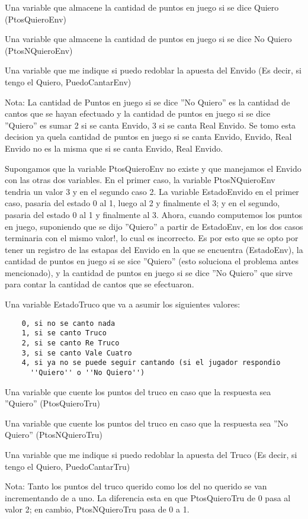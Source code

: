 Una variable que almacene la cantidad de puntos en juego si se dice Quiero (PtosQuieroEnv)

Una variable que almacene la cantidad de puntos en juego si se dice No Quiero (PtosNQuieroEnv)

Una variable que me indique si puedo redoblar la apuesta del Envido (Es decir, si tengo el Quiero, PuedoCantarEnv)

Nota: La cantidad de Puntos en juego si se dice ''No Quiero'' es la cantidad de cantos que se hayan efectuado y la cantidad de puntos en juego si se dice ''Quiero'' es sumar 2 si se canta Envido, 3 si se canta Real Envido. Se tomo esta decision ya quela cantidad de puntos en juego si se canta Envido, Envido, Real Envido no es la misma que si se canta Envido, Real Envido.

Supongamos que la variable PtosQuieroEnv no existe y que manejamos el Envido con las otras dos variables. En el primer caso, la variable PtosNQuieroEnv tendria un valor 3 y en el segundo caso 2. La variable EstadoEnvido en el primer caso, pasaria del estado 0 al 1, luego al 2 y finalmente el 3; y en el segundo, pasaria del estado 0 al 1 y finalmente al 3. Ahora, cuando computemos los puntos en juego, suponiendo que se dijo ''Quiero'' a partir de EstadoEnv, en los dos casos terminaria con el mismo valor!, lo cual es incorrecto. Es por esto que se opto por tener un registro de las estapas del Envido en la que se encuentra (EstadoEnv), la cantidad de puntos en juego si se sice ''Quiero'' (esto soluciona el problema antes mencionado), y la cantidad de puntos en juego si se dice ''No Quiero'' que sirve para contar la cantidad de cantos que se efectuaron.


Una variable EstadoTruco que va a asumir los siguientes valores:
\begin{verbatim}
    0, si no se canto nada
    1, si se canto Truco
    2, si se canto Re Truco
    3, si se canto Vale Cuatro
    4, si ya no se puede seguir cantando (si el jugador respondio
      ''Quiero'' o ''No Quiero'')
\end{verbatim}

Una variable que cuente los puntos del truco en caso que la respuesta sea ''Quiero'' (PtosQuieroTru)

Una variable que cuente los puntos del truco en caso que la respuesta sea ''No Quiero'' (PtosNQuieroTru)

Una variable que me indique si puedo redoblar la apuesta del Truco (Es decir, si tengo el Quiero, PuedoCantarTru)

Nota: Tanto los puntos del truco querido como los del no querido se van incrementando de a uno. La diferencia esta en que PtosQuieroTru de 0 pasa al valor 2; en cambio, PtosNQuieroTru pasa de 0 a 1.
